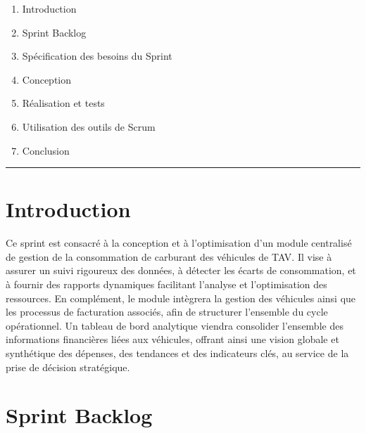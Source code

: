 \documentclass[a4paper,11pt]{report}
\begin{document}
\begin{enumerate}[%
  label=\bfseries\Large\arabic*., 
  leftmargin=2cm, 
  itemsep=1em
]
   \item Introduction
  \item Sprint Backlog
  \item Spécification des besoins du Sprint
  \item Conception
  \item Réalisation et tests
  \item Utilisation des outils de Scrum
  \item Conclusion
\end{enumerate}

\vfill
\begin{center}
  \color{blue!60!black}\rule{0.6\textwidth}{0.8pt}
\end{center}

\newpage
\setcounter{section}{0}

\section{Introduction}

Ce sprint est consacré à la conception et à l’optimisation d’un module centralisé de gestion de la consommation de carburant des véhicules de TAV. Il vise à assurer un suivi rigoureux des données, à détecter les écarts de consommation, et à fournir des rapports dynamiques facilitant l’analyse et l’optimisation des ressources. En complément, le module intègrera la gestion des véhicules ainsi que les processus de facturation associés, afin de structurer l’ensemble du cycle opérationnel. Un tableau de bord analytique viendra consolider l’ensemble des informations financières liées aux véhicules, offrant ainsi une vision globale et synthétique des dépenses, des tendances et des indicateurs clés, au service de la prise de décision stratégique.

\section{Sprint Backlog}
\end{document}

